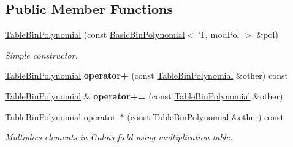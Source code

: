 \subsection*{Public Member Functions}
\begin{DoxyCompactItemize}
\item 
\mbox{\label{class_g_flinalg_1_1_table_bin_polynomial_aee6d9eaeabd50f3a76858b9dea26532d}} 
\mbox{\hyperlink{class_g_flinalg_1_1_table_bin_polynomial_aee6d9eaeabd50f3a76858b9dea26532d}{Table\+Bin\+Polynomial}} (const \mbox{\hyperlink{class_g_flinalg_1_1_basic_bin_polynomial}{Basic\+Bin\+Polynomial}}$<$ T, mod\+Pol $>$ \&pol)
\begin{DoxyCompactList}\small\item\em Simple constructor. \end{DoxyCompactList}\item 
\mbox{\label{class_g_flinalg_1_1_table_bin_polynomial_a2a25a2a64e29b4aab4d0d45109cd0f89}} 
\mbox{\hyperlink{class_g_flinalg_1_1_table_bin_polynomial}{Table\+Bin\+Polynomial}} {\bfseries operator+} (const \mbox{\hyperlink{class_g_flinalg_1_1_table_bin_polynomial}{Table\+Bin\+Polynomial}} \&other) const
\item 
\mbox{\label{class_g_flinalg_1_1_table_bin_polynomial_a961829b3d64969077ec2943821911801}} 
\mbox{\hyperlink{class_g_flinalg_1_1_table_bin_polynomial}{Table\+Bin\+Polynomial}} \& {\bfseries operator+=} (const \mbox{\hyperlink{class_g_flinalg_1_1_table_bin_polynomial}{Table\+Bin\+Polynomial}} \&other)
\item 
\mbox{\label{class_g_flinalg_1_1_table_bin_polynomial_aee549de1d1d0656e4700c30861934a79}} 
\mbox{\hyperlink{class_g_flinalg_1_1_table_bin_polynomial}{Table\+Bin\+Polynomial}} \mbox{\hyperlink{class_g_flinalg_1_1_table_bin_polynomial_aee549de1d1d0656e4700c30861934a79}{operator $\ast$}} (const \mbox{\hyperlink{class_g_flinalg_1_1_table_bin_polynomial}{Table\+Bin\+Polynomial}} \&other) const
\begin{DoxyCompactList}\small\item\em Multiplies elements in Galois field using multiplication table. \end{DoxyCompactList}\item 

\end{DoxyCompactItemize}
